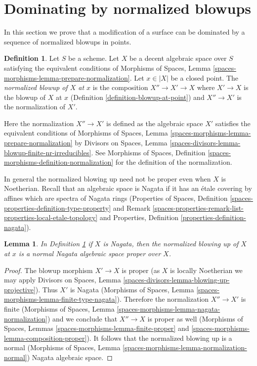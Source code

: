 \documentclass{stacks-project}
\theoremstyle{plain}
\newtheorem{lemma}[subsection]{Lemma}
\theoremstyle{definition}
\newtheorem{definition}[subsection]{Definition}
\theoremstyle{remark}
\numberwithin{equation}{subsection}
\begin{document}
\section{Dominating by normalized blowups}
\label{section-normalized-blowups}

\noindent
In this section we prove that a modification of a surface can be dominated
by a sequence of normalized blowups in points.

\begin{definition}
\label{definition-normalized-blowup}
Let $S$ be a scheme. Let $X$ be a decent algebraic space over $S$ satisfying
the equivalent conditions of
Morphisms of Spaces, Lemma \ref{spaces-morphisms-lemma-prepare-normalization}.
Let $x \in |X|$ be a closed point. The {\it normalized blowup of $X$ at $x$}
is the composition $X'' \to X' \to X$ where $X' \to X$ is the blowup
of $X$ at $x$ (Definition \ref{definition-blowup-at-point})
and $X'' \to X'$ is the normalization of $X'$.
\end{definition}

\noindent
Here the normalization $X'' \to X'$ is defined as the algebraic space
$X'$ satisfies the equivalent conditions of
Morphisms of Spaces, Lemma \ref{spaces-morphisms-lemma-prepare-normalization}
by
Divisors on Spaces, Lemma
\ref{spaces-divisors-lemma-blowup-finite-nr-irreducibles}.
See Morphisms of Spaces, Definition
\ref{spaces-morphisms-definition-normalization}
for the definition of the normalization.

\medskip\noindent
In general the normalized blowing up need not be proper even
when $X$ is Noetherian. Recall that an algebraic space is Nagata if it
has an \'etale covering by affines which are spectra of Nagata rings
(Properties of Spaces, Definition
\ref{spaces-properties-definition-type-property} and
Remark \ref{spaces-properties-remark-list-properties-local-etale-topology} and
Properties, Definition \ref{properties-definition-nagata}).

\begin{lemma}
\label{lemma-Nagata-normalized-blowup}
In Definition \ref{definition-normalized-blowup} if $X$ is Nagata,
then the normalized blowing up of $X$ at $x$ is a
normal Nagata algebraic space proper over $X$.
\end{lemma}

\begin{proof}
The blowup morphism $X' \to X$ is proper
(as $X$ is locally Noetherian we may apply
Divisors on Spaces, Lemma \ref{spaces-divisors-lemma-blowing-up-projective}).
Thus $X'$ is Nagata
(Morphisms of Spaces, Lemma \ref{spaces-morphisms-lemma-finite-type-nagata}).
Therefore the normalization $X'' \to X'$ is finite
(Morphisms of Spaces, Lemma \ref{spaces-morphisms-lemma-nagata-normalization})
and we conclude that $X'' \to X$ is proper as well
(Morphisms of Spaces, Lemmas \ref{spaces-morphisms-lemma-finite-proper} and
\ref{spaces-morphisms-lemma-composition-proper}).
It follows that the normalized blowing up
is a normal (Morphisms of Spaces, Lemma
\ref{spaces-morphisms-lemma-normalization-normal})
Nagata algebraic space.
\end{proof}
\end{document}

